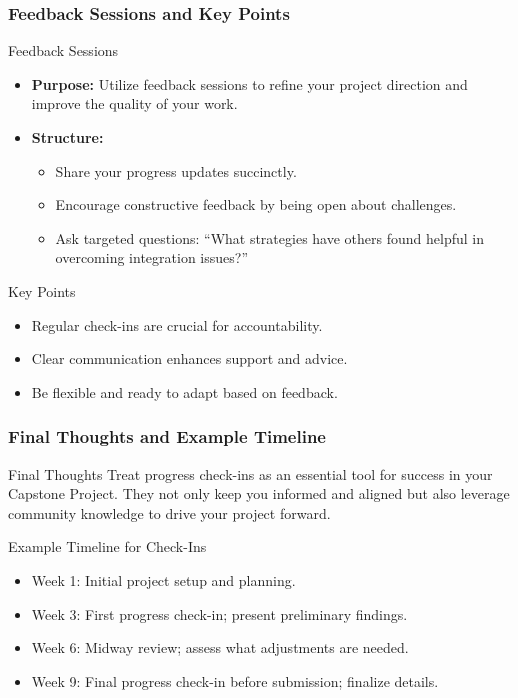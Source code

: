 \documentclass[aspectratio=169]{beamer}
\begin{document}
\begin{frame}[fragile]
    \frametitle{Feedback Sessions and Key Points}
    \begin{block}{Feedback Sessions}
        \begin{itemize}
            \item \textbf{Purpose:} Utilize feedback sessions to refine your project direction and improve the quality of your work.
            \item \textbf{Structure:}
            \begin{itemize}
                \item Share your progress updates succinctly.
                \item Encourage constructive feedback by being open about challenges.
                \item Ask targeted questions: ``What strategies have others found helpful in overcoming integration issues?''
            \end{itemize}
        \end{itemize}
    \end{block}
    
    \begin{block}{Key Points}
        \begin{itemize}
            \item Regular check-ins are crucial for accountability.
            \item Clear communication enhances support and advice.
            \item Be flexible and ready to adapt based on feedback.
        \end{itemize}
    \end{block}
\end{frame}

\begin{frame}[fragile]
    \frametitle{Final Thoughts and Example Timeline}
    \begin{block}{Final Thoughts}
        Treat progress check-ins as an essential tool for success in your Capstone Project. They not only keep you informed and aligned but also leverage community knowledge to drive your project forward.
    \end{block}
    
    \begin{block}{Example Timeline for Check-Ins}
        \begin{itemize}
            \item Week 1: Initial project setup and planning.
            \item Week 3: First progress check-in; present preliminary findings.
            \item Week 6: Midway review; assess what adjustments are needed.
            \item Week 9: Final progress check-in before submission; finalize details.
        \end{itemize}
    \end{block}
\end{frame}
\end{document}
